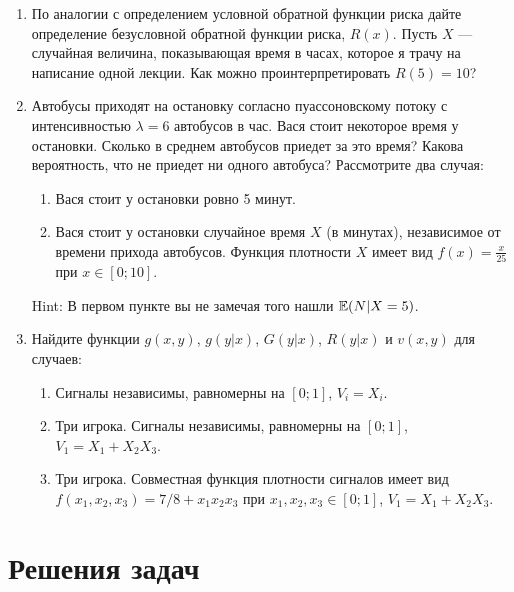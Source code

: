 \begin{enumerate}
\item По аналогии с определением условной обратной функции риска дайте определение безусловной обратной функции риска, $ R(x) $. Пусть $ X $ — случайная величина, показывающая время в часах, которое я трачу на написание одной лекции. Как можно проинтерпретировать $ R(5)=10 $?
\item Автобусы приходят на остановку согласно пуассоновскому потоку с интенсивностью $ \lambda=6 $ автобусов в час. Вася стоит некоторое время у остановки. Сколько в среднем автобусов приедет за это время? Какова вероятность, что не приедет ни одного автобуса? Рассмотрите два случая:
\begin{enumerate}
\item Вася стоит у остановки ровно 5 минут.
\item Вася стоит у остановки случайное время $ X $ (в минутах), независимое от времени прихода автобусов. Функция плотности $ X $ имеет вид $ f(x)= \frac{x}{25}$ при $ x\in [0;10] $.
\end{enumerate}
Hint: В первом пункте вы не замечая того нашли $ \mathbb{E}(N|X=5) $.
\item Найдите функции $ g(x,y)$, $ g(y|x)$, $ G(y|x)$,  $R(y|x)$ и $v(x,y)$ для случаев:
\label{ex_vxy}
\begin{enumerate}
\item Сигналы независимы, равномерны на $ [0;1] $, $ V_{i}=X_{i} $.
\item Три игрока. Сигналы независимы, равномерны на $ [0;1] $, $ V_{1}=X_{1}+X_{2}X_{3} $.
\item Три игрока. Совместная функция плотности сигналов имеет вид $ f(x_{1},x_{2},x_{3})=7/8+x_{1}x_{2}x_{3} $ при $ x_{1},x_{2},x_{3}\in[0;1] $, $ V_{1}=X_{1}+X_{2}X_{3} $.
\end{enumerate}
\end{enumerate}


\section{Решения задач}

